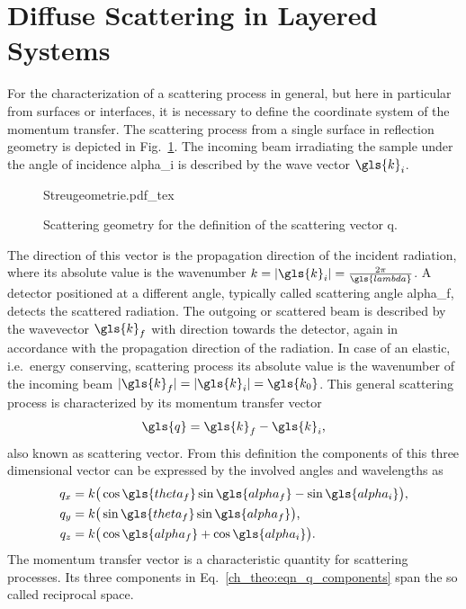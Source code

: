 \section{Diffuse Scattering in Layered Systems} \label{ch_theo:sec_diffuse_scattering}
For the characterization of a scattering process in general, but here in particular from surfaces or interfaces, it is necessary to define the coordinate system of the momentum transfer. The scattering process from a single surface in reflection geometry is depicted in Fig.~\ref{ch_theo:fig_scattering_process}. The incoming beam irradiating the sample under the angle of incidence \gls{alpha_i} is described by the wave vector $\gls{k}_i$.
\begin{figure}[htb]
    {Streugeometrie.pdf_tex}
    \caption[Scattering geometry and definition of the scattering vector.]{Scattering geometry for the definition of the scattering vector \gls{q}.}
    \label{ch_theo:fig_scattering_process}
\end{figure}
The direction of this vector is the propagation direction of the incident radiation, where its absolute value is the wavenumber $k = |\gls{k}_i| = \frac{2 \pi}{\gls{lambda}}$. A detector positioned at a different angle, typically called scattering angle \gls{alpha_f}, detects the scattered radiation. The outgoing or scattered beam is described by the wavevector $\gls{k}_f$ with direction towards the detector, again in accordance with the propagation direction of the radiation. In case of an elastic, i.e.~energy conserving, scattering process its absolute value is the wavenumber of the incoming beam $|\gls{k}_f| = |\gls{k}_i| = \gls{k_0}$. This general scattering process is characterized by its momentum transfer vector 
\begin{align}
\gls{q} = \gls{k}_f - \gls{k}_i\text{,} \label{ch:theo_eqn:q}
\end{align}
also known as scattering vector. From this definition the components of this three dimensional vector can be expressed by the involved angles and wavelengths as
\begin{align}\begin{split}
q_x &= k \big( \cos \gls{theta_f} \sin \gls{alpha_f} - \sin \gls{alpha_i}\big)\text{,}\\
q_y &= k \big( \sin \gls{theta_f} \sin \gls{alpha_f}\big)\text{,}\\
q_z &= k \big( \cos \gls{alpha_f} + \cos \gls{alpha_i}\big)\text{.}
\end{split} \label{ch_theo:eqn_q_components}
\end{align}
The momentum transfer vector is a characteristic quantity for scattering processes. Its three components in Eq.~\eqref{ch_theo:eqn_q_components} span the so called reciprocal space.


